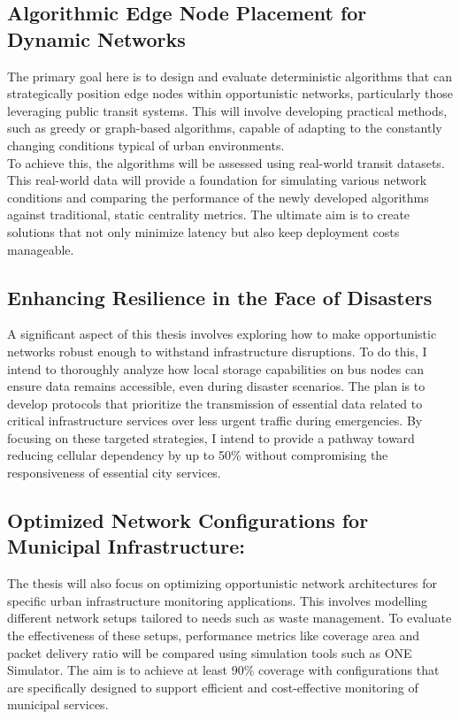 \documentclass[10pt,a4paper]{report}
\begin{document}
\subsection{Algorithmic Edge Node Placement for Dynamic Networks}

The primary goal here is to design and evaluate deterministic algorithms that
can strategically position edge nodes within opportunistic networks, particularly
those leveraging public transit systems. This will involve developing practical
methods, such as greedy or graph-based algorithms, capable of adapting to the
constantly changing conditions typical of urban environments.\\
To achieve this, the algorithms will be assessed using real-world transit datasets.
This real-world data will provide a foundation for simulating various network
conditions and comparing the performance of the newly developed algorithms against
traditional, static centrality metrics. The ultimate aim is to create solutions
that not only minimize latency but also keep deployment costs manageable.\\
\subsection{Enhancing Resilience in the Face of Disasters}

A significant aspect of this thesis involves exploring how to make opportunistic
networks robust enough to withstand infrastructure disruptions. To do this, I
intend to thoroughly analyze how local storage capabilities on bus nodes can
ensure data remains accessible, even during disaster scenarios. The plan is to
develop protocols that prioritize the transmission of essential data related to
critical infrastructure services over less urgent traffic during emergencies. By
focusing on these targeted strategies, I intend to provide a pathway toward
reducing cellular dependency by up to 50\% without compromising the responsiveness
of essential city services.\\

\subsection{Optimized Network Configurations for Municipal Infrastructure:}
The thesis will also focus on optimizing opportunistic network architectures
for specific urban infrastructure monitoring applications. This involves modelling
different network setups tailored to needs such as waste management. To evaluate
the effectiveness of these setups, performance metrics like coverage area and
packet delivery ratio will be compared using simulation tools such as ONE Simulator.
The aim is to achieve at least 90\% coverage with configurations that are
specifically designed to support efficient and cost-effective monitoring of
municipal services.\\
\end{document}
